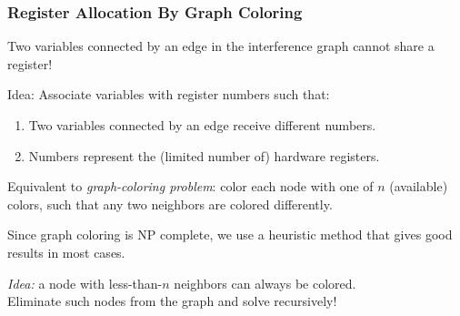 \documentclass{beamer}
\renewcommand{\emph}[1]{\textcolor{structure}{#1}}
\newcommand{\emp}[1]{\textcolor{DikuRed}{ #1}}
\begin{document}
\begin{frame}
\frametitle{Register Allocation By Graph Coloring}

\emp{Two variables connected by an edge in the interference graph cannot
share a register!}

\bigskip


Idea: Associate variables with register numbers such that:

\smallskip

\begin{enumerate}

\item Two variables connected by an edge receive different numbers.

\item Numbers represent the (limited number of) hardware registers.

\end{enumerate}

\bigskip

Equivalent to {\em graph-coloring problem}: color each node with one of $n$
(available) colors, such that any two neighbors are colored differently.

\bigskip

Since \emp{graph coloring is NP complete}, we use a \emph{heuristic method} that
gives good results in most cases.

\bigskip

\emph{{\em Idea:} a node with less-than-$n$ neighbors can always be colored.\\
Eliminate such nodes from the graph and solve recursively!}

\end{frame}
\end{document}
